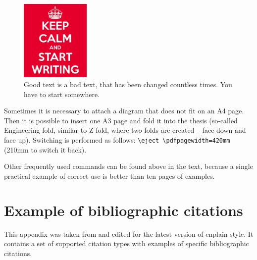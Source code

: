 \begin{figure}[hbt]
	\centering
	\includegraphics[width=0.3\textwidth]{images/keep-calm.png}
	\caption{Good text is a bad text, that has been changed countless times. You have to start somewhere.}
	\label{keepCalm}
\end{figure}

Sometimes it is necessary to attach a diagram that does not fit on an A4 page. Then it is possible to insert one A3 page and fold it into the thesis (so-called Engineering fold, similar to Z-fold, where two folds are created -- face down and face up). Switching is performed as follows: \texttt{\textbackslash{}eject \textbackslash{}pdfpagewidth=420mm} (210mm to switch it back).

Other frequently used commands can be found above in the text, because a single practical example of correct use is better than ten pages of examples.



\newcommand{\zarazky}{%
Location in source document: \= %
Some horribly long example \= \kill}

\newcommand{\odradkovani}{\\[0.3em]}

\chapter{Example of bibliographic citations}
\label{priloha-priklady-citaci}
This appendix was taken from \cite{Pysny} and edited for the latest version of enplain style. It contains a set of supported citation types with examples of specific bibliographic citations.

